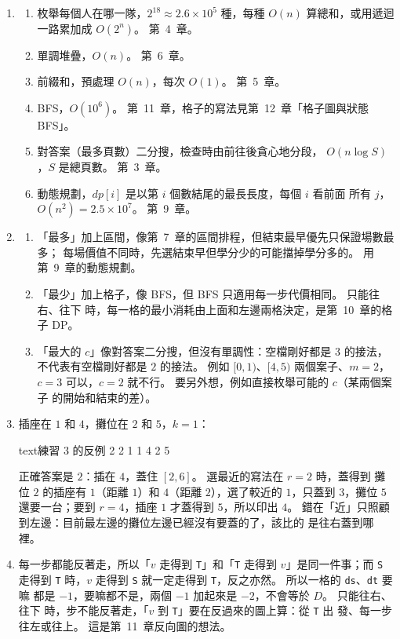 \begin{enumerate}
\item
\begin{enumerate}
\item 枚舉每個人在哪一隊，$2^{18} \approx 2.6 \times 10^5$ 種，每種 $O(n)$
算總和，或用遞迴一路累加成 $O(2^n)$。 第~4~章。
\item 單調堆疊，$O(n)$。 第~6~章。
\item 前綴和，預處理 $O(n)$，每次 $O(1)$。 第~5~章。
\item BFS，$O(10^6)$。 第~11~章，格子的寫法見第~12~章「格子圖與狀態 BFS」。
\item 對答案（最多頁數）二分搜，檢查時由前往後貪心地分段，
$O(n \log S)$，$S$ 是總頁數。 第~3~章。
\item 動態規劃，$\mathit{dp}[i]$ 是以第 $i$ 個數結尾的最長長度，每個 $i$ 看前面
所有 $j$，$O(n^2) = 2.5 \times 10^7$。 第~9~章。
\end{enumerate}

\item
\begin{enumerate}
\item 「最多」加上區間，像第~7~章的區間排程，但結束最早優先只保證場數最多；
每場價值不同時，先選結束早但學分少的可能擋掉學分多的。 用第~9~章的動態規劃。
\item 「最少」加上格子，像 BFS，但 BFS 只適用每一步代價相同。 只能往右、往下
時，每一格的最小消耗由上面和左邊兩格決定，是第~10~章的格子 DP。
\item 「最大的 $c$」像對答案二分搜，但沒有單調性：空檔剛好都是 $3$ 的接法，
不代表有空檔剛好都是 $2$ 的接法。 例如 $[0, 1)$、$[4, 5)$ 兩個案子、$m = 2$，
$c = 3$ 可以，$c = 2$ 就不行。 要另外想，例如直接枚舉可能的 $c$（某兩個案子
的開始和結束的差）。
\end{enumerate}

\item 插座在 $1$ 和 $4$，攤位在 $2$ 和 $5$，$k = 1$：
\begin{code}{text}{練習 3 的反例}
2 2 1
1 4
2 5
\end{code}
正確答案是 $2$：插在 $4$，蓋住 $[2, 6]$。 選最近的寫法在 $r = 2$ 時，蓋得到
攤位 $2$ 的插座有 $1$（距離 $1$）和 $4$（距離 $2$），選了較近的 $1$，只蓋到
$3$，攤位 $5$ 還要一台；要到 $r = 4$，插座 $1$ 才蓋得到 $5$，所以印出
$4$。 錯在「近」只照顧到左邊：目前最左邊的攤位左邊已經沒有要蓋的了，該比的
是往右蓋到哪裡。

\item 每一步都能反著走，所以「$v$ 走得到 \texttt{T}」和「\texttt{T} 走得到
$v$」是同一件事；而 \texttt{S} 走得到 \texttt{T} 時，$v$ 走得到 \texttt{S}
就一定走得到 \texttt{T}，反之亦然。 所以一格的 \texttt{ds}、\texttt{dt} 要嘛
都是 $-1$，要嘛都不是，兩個 $-1$ 加起來是 $-2$，不會等於 $D$。 只能往右、往下
時，步不能反著走，「$v$ 到 \texttt{T}」要在反過來的圖上算：從 \texttt{T} 出
發、每一步往左或往上。 這是第~11~章反向圖的想法。


\end{enumerate}
